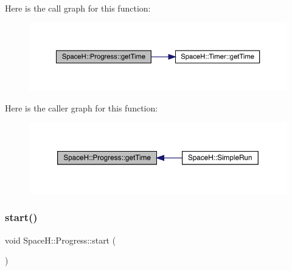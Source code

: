 Here is the call graph for this function\+:
\nopagebreak
\begin{figure}[H]
\begin{center}
\leavevmode
\includegraphics[width=350pt]{class_space_h_1_1_progress_a65de623956f06ddf7b587dd248916dff_cgraph}
\end{center}
\end{figure}
Here is the caller graph for this function\+:
\nopagebreak
\begin{figure}[H]
\begin{center}
\leavevmode
\includegraphics[width=350pt]{class_space_h_1_1_progress_a65de623956f06ddf7b587dd248916dff_icgraph}
\end{center}
\end{figure}
\mbox{\label{class_space_h_1_1_progress_ad8537bcca9928ac45c2ce4f89645e681}} 
\subsubsection{\texorpdfstring{start()}{start()}}
{\footnotesize\ttfamily void Space\+H\+::\+Progress\+::start (\begin{DoxyParamCaption}{ }\end{DoxyParamCaption})\hspace{0.3cm}{\ttfamily [inline]}}

